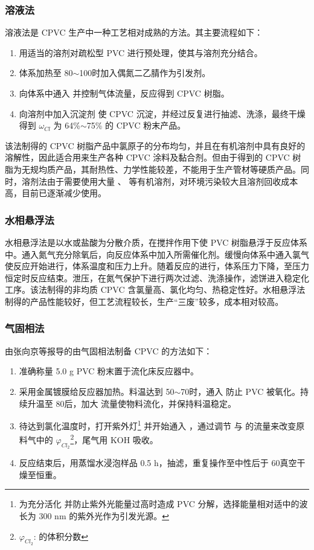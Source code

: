 \subsubsection{溶液法}

溶液法是 CPVC 生产中一种工艺相对成熟的方法。其主要流程如下：

\begin{enumerate}[(1) ]
	\item 用适当的溶剂对疏松型 PVC 进行预处理，使其与溶剂充分结合。
	\item 体系加热至 80$\sim$100\cd 时加入偶氮二乙腈作为引发剂。
	\item 向体系中通入  并控制气体流量，反应得到 CPVC 树脂。
	\item 向溶剂中加入沉淀剂  使 CPVC 沉淀，并经过反复进行抽滤、洗涤，最终干燥得到 $\omega_{Cl}$ 为 64\%$\sim$75\% 的 CPVC 粉末产品。
\end{enumerate}

该法制得的 CPVC 树脂产品中氯原子的分布均匀，并且在有机溶剂中具有良好的溶解性，因此适合用来生产各种 CPVC 涂料及黏合剂。但由于得到的 CPVC 树脂为无规均质产品，其耐热性、力学性能较差，不能用于生产管材等硬质产品。同时，溶剂法由于需要使用大量 、 等有机溶剂，对环境污染较大且溶剂回收成本高，目前已逐渐减少使用。

\subsubsection{水相悬浮法}
水相悬浮法是以水或盐酸为分散介质，在搅拌作用下使 PVC 树脂悬浮于反应体系中。通入氮气充分除氧后，向反应体系中加入所需催化剂。缓慢向体系中通入氯气使反应开始进行，体系温度和压力上升。随着反应的进行，体系压力下降，至压力恒定时反应结束。泄压，在氮气保护下进行两次过滤、洗涤操作，滤饼进入稳定化工序\cite{23}。该法制得的非均质 CPVC 含氯量高、氯化均匀、热稳定性好。水相悬浮法制得的产品性能较好，但工艺流程较长，生产“三废”较多，成本相对较高。

\subsubsection{气固相法}
由张向京等\cite{1}报导的由气固相法制备 CPVC 的方法如下：

\begin{enumerate}[(1) ]
    \item 准确称量 5.0 g PVC 粉末置于流化床反应器中。
    \item 采用金属镀膜给反应器加热。料温达到 50$\sim$70\cd 时，通入  防止 PVC 被氧化。持续升温至 80\cd 后，加大  流量使物料流化，并保持料温稳定。
    \item 待达到氯化温度时，打开紫外灯\footnote{为充分活化  并防止紫外光能量过高时造成 PVC 分解，选择能量相对适中的波长为 300 nm 的紫外光作为引发光源。} 并开始通入 ，通过调节  与  的流量来改变原料气中的 $\varphi_{Cl_2}$\footnote{$\varphi_{Cl_2}$:  的体积分数}，尾气用 KOH 吸收。
    \item 反应结束后，用蒸馏水浸泡样品 0.5 h，抽滤，重复操作至中性后于 60\cd 真空干燥至恒重。
\end{enumerate}

